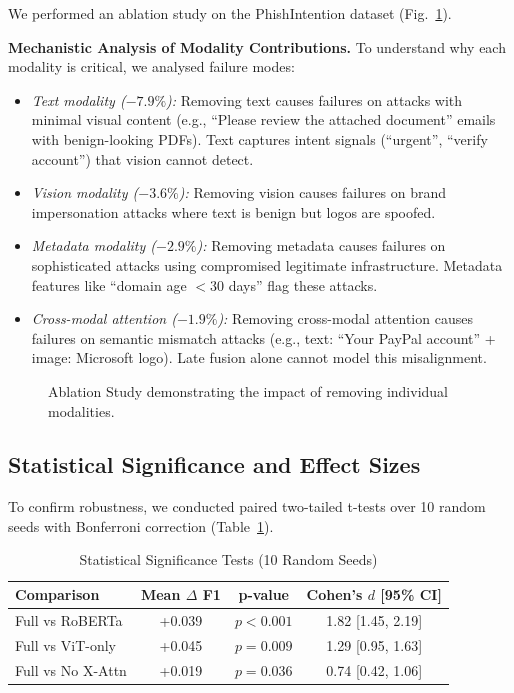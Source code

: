 \documentclass[conference]{IEEEtran}
\begin{document}
We performed an ablation study on the PhishIntention dataset (Fig.~\ref{fig:ablation}).

\textbf{Mechanistic Analysis of Modality Contributions.} To understand why each modality is critical, we analysed failure modes:
\begin{itemize}
    \item \textit{Text modality ($-7.9\%$):} Removing text causes failures on attacks with minimal visual content (e.g., ``Please review the attached document'' emails with benign-looking PDFs). Text captures intent signals (``urgent'', ``verify account'') that vision cannot detect.
    \item \textit{Vision modality ($-3.6\%$):} Removing vision causes failures on brand impersonation attacks where text is benign but logos are spoofed.
    \item \textit{Metadata modality ($-2.9\%$):} Removing metadata causes failures on sophisticated attacks using compromised legitimate infrastructure. Metadata features like ``domain age $< 30$ days'' flag these attacks.
    \item \textit{Cross-modal attention ($-1.9\%$):} Removing cross-modal attention causes failures on semantic mismatch attacks (e.g., text: ``Your PayPal account'' + image: Microsoft logo). Late fusion alone cannot model this misalignment.
\end{itemize}

\begin{figure}[t]
    \centering
    \caption{Ablation Study demonstrating the impact of removing individual modalities.}
    \label{fig:ablation}
\end{figure}

\subsection{Statistical Significance and Effect Sizes}

To confirm robustness, we conducted paired two-tailed t-tests over 10 random seeds with Bonferroni correction (Table~\ref{tab:significance}).

\begin{table}[t]
    \centering
    \caption{Statistical Significance Tests (10 Random Seeds)}
    \label{tab:significance}
    \begin{tabular}{lccc}
        \toprule
        Comparison & Mean $\Delta$ F1 & p-value & Cohen's $d$ [95\% CI] \\
        \midrule
        Full vs RoBERTa & +0.039 & $p < 0.001$ & 1.82 [1.45, 2.19] \\
        Full vs ViT-only & +0.045 & $p = 0.009$ & 1.29 [0.95, 1.63] \\
        Full vs No X-Attn & +0.019 & $p = 0.036$ & 0.74 [0.42, 1.06] \\
        \bottomrule
    \end{tabular}
\end{table}
\end{document}
